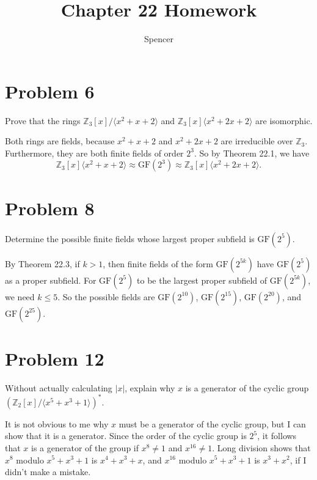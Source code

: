 \documentclass{article}
\title{Chapter 22 Homework}
\author{Spencer}
\begin{document}
\maketitle

\newcommand{\Z}{\mathbb{Z}}
\newcommand{\R}{\mathbb{R}}
\newcommand{\N}{\mathbb{N}}
\newcommand{\Q}{\mathbb{Q}}
\newcommand{\GF}{\mbox{GF}}

\section*{Problem 6}

Prove that the rings $\Z_3[x]/\langle x^2+x+2\rangle$ and $\Z_3[x]\langle x^2+2x+2\rangle$
are isomorphic.

Both rings are fields, because $x^2+x+2$ and $x^2+2x+2$ are irreducible over $\Z_3$.
Furthermore, they are both finite fields of order $2^3$.  So by Theorem 22.1,
we have
\begin{equation*}
\Z_3[x]\langle x^2+x+2\rangle\approx\GF(2^3)\approx\Z_3[x]\langle x^2+2x+2\rangle.
\end{equation*}

\section*{Problem 8}

Determine the possible finite fields whose largest proper subfield is $\GF(2^5)$.

By Theorem 22.3, if $k>1$, then finite fields of the form $\GF(2^{5k})$ have
$\GF(2^5)$ as a proper subfield.  For $\GF(2^5)$ to be the largest proper subfield
of $\GF(2^{5k})$, we need $k\leq 5$.  So the possible fields are $\GF(2^{10})$,
$\GF(2^{15})$, $\GF(2^{20})$, and $\GF(2^{25})$.

\section*{Problem 12}

Without actually calculating $|x|$, explain why $x$ is a generator of the
cyclic group $(\Z_2[x]/\langle x^5+x^3+1\rangle)^{*}$.

It is not obvious to me why $x$ must be a generator of the cyclic group,
but I can show that it is a generator.  Since the order of the cyclic group
is $2^5$, it follows that $x$ is a generator of the group if $x^8\neq 1$ and
$x^{16}\neq 1$.  Long division shows that $x^8$ modulo $x^5+x^3+1$ is $x^4+x^3+x$,
and $x^{16}$ modulo $x^5+x^3+1$ is $x^3+x^2$, if I didn't make a mistake.
\end{document}
